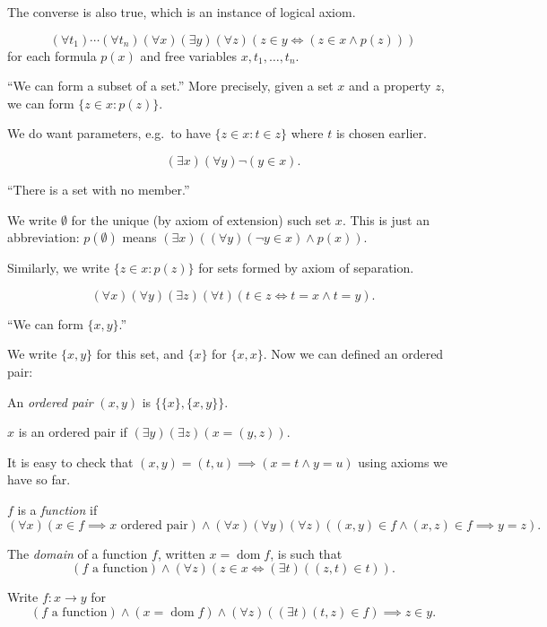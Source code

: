 \documentclass[a4paper]{article}
\DeclareMathOperator{\dom}{dom}%
\begin{document}
\begin{note}
  The converse is also true, which is an instance of logical axiom.
\end{note}

\begin{axiom*}
  \[
    (\forall t_1) \cdots (\forall t_n) (\forall x) (\exists y) (\forall z) (z \in y \iff (z \in x \land p(z)))
  \]
  for each formula \(p(x)\) and free variables \(x, t_1, \dots, t_n\).
\end{axiom*}
``We can form a subset of a set.'' More precisely, given a set \(x\) and a property \(z\), we can form \(\{z \in x: p(z)\}\).

\begin{note}
  We do want parameters, e.g.\ to have \(\{z \in x: t \in z\}\) where \(t\) is chosen earlier.
\end{note}

\begin{axiom*}
  \[
    (\exists x) (\forall y) \neg (y \in x).
  \]
\end{axiom*}
``There is a set with no member.''

We write \(\emptyset\) for the unique (by axiom of extension) such set \(x\). This is just an abbreviation: \(p(\emptyset)\) means \((\exists x) ((\forall y) (\neg y \in x) \land p(x))\).

Similarly, we write \(\{z \in x: p(z)\}\) for sets formed by axiom of separation.

\begin{axiom*}
  \[
    (\forall x) (\forall y) (\exists z) (\forall t) (t \in z \iff t = x \land t = y).
  \]
\end{axiom*}
``We can form \(\{x, y\}\).''

We write \(\{x, y\}\) for this set, and \(\{x\}\) for \(\{x, x\}\). Now we can defined an ordered pair:

\begin{definition}
  An \emph{ordered pair} \((x, y)\) is \(\{\{x\}, \{x, y\}\}\).

  \(x\) is an ordered pair if \((\exists y) (\exists z) (x = (y, z))\).
\end{definition}

It is easy to check that \((x, y) = (t, u) \implies (x = t \land y = u)\) using axioms we have so far.

\begin{definition}[Function]
  \(f\) is a \emph{function} if
  \[
    (\forall x) (x \in f \implies x \text{ ordered pair}) \land (\forall x) (\forall y) (\forall z) ((x, y) \in f \land (x, z) \in f \implies y = z).
  \]

  The \emph{domain} of a function \(f\), written \(x = \dom f\), is such that
  \[
    (f \text{ a function}) \land (\forall z) (z \in x \iff (\exists t) ((z, t) \in t)).
  \]

  Write \(f: x \to y\) for
  \[
    (f \text{ a function}) \land (x = \dom f) \land (\forall z) ((\exists t) (t, z) \in f) \implies z \in y.
  \]
\end{definition}
\end{document}
